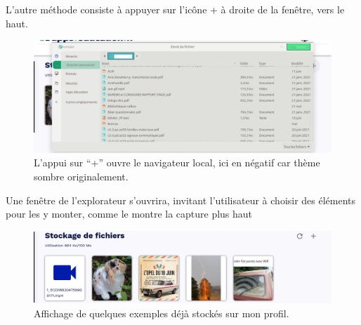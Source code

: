 L'autre méthode consiste à appuyer sur l'icône + à droite de la fenêtre, vers le haut.
\begin{figure}
	\centering
	\includegraphics{./Captures/portail.stockage.medias.explorateur.png}
	\caption{L'appui sur ``+'' ouvre le navigateur local, ici en négatif car thème sombre originalement.}
\end{figure}
Une fenêtre de l'explorateur s'ouvrira, invitant l'utilisateur à choisir des éléments pour les y monter, comme le montre la capture plus haut
\begin{figure}
	\centering
	\includegraphics{./Captures/portail.stockage.medias.exemples.png}
	\caption{Affichage de quelques exemples déjà stockés sur mon profil.}
\end{figure}

